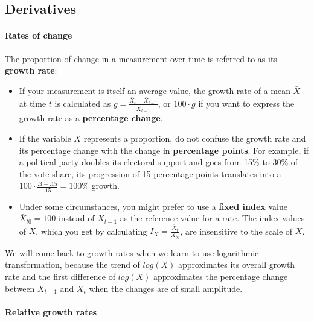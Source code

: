 %
%
\subsection{Derivatives}

  \paragraph{Rates of change}
    
  The proportion of change in a measurement over time is referred to as its \textbf{growth rate}:%

\begin{itemize}
	\item If your measurement is itself an average value, the growth rate of a mean $\bar{X}$ at time $t$ is calculated as $g = \frac{\bar{X}_t - \bar{X}_{t-1}}{\bar{X}_{t-1}}$, or $100 \cdot g$ if you want to express the growth rate as a \textbf{percentage change}.%

	\item If the variable $X$ represents a proportion, do not confuse the growth rate and its percentage change with the change in \textbf{percentage points}. For example, if a political party doubles its electoral support and goes from 15\% to 30\% of the vote share, its progression of 15 percentage points translates into a $100 \cdot \frac{.3-.15}{.15} = 100\%$ growth.%
	
	\item Under some circumstances, you might prefer to use a \textbf{fixed index} value $\bar{X}_{t0} = 100$ instead of $X_{t-1}$ as the reference value for a rate. The index values of $X$, which you get by calculating $I_X = \frac{\bar{X}_t}{X_{t0}}$, are insensitive to the scale of $X$.%
	\end{itemize}

We will come back to growth rates when we learn to use logarithmic transformation, because the trend of $log(X)$ approximates its overall growth rate and the first difference of $log(X)$ approximates the percentage change between $X_{t-1}$ and $X_t$ when the changes are of small amplitude.%


  \paragraph{Relative growth rates}

